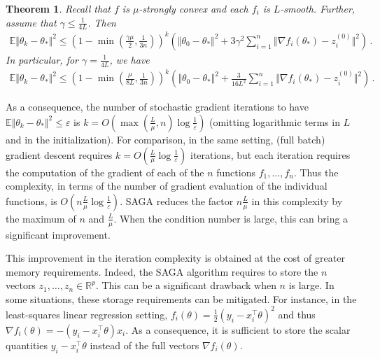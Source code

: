 \documentclass[11pt,reqno]{article}
\newcommand{\E}{\mathbb{E}}
\newcommand{\R}{\mathbb{R}}
\renewcommand{\leq}{\leqslant}
\numberwithin{equation}{section}
\theoremstyle{plain}
\newtheorem{thm}[assumption]{Theorem}
\theoremstyle{definition}
\theoremstyle{remark}
\begin{document}
\begin{thm}
	Recall that $f$ is $\mu$-strongly convex and each $f_i$ is $L$-smooth. Further, assume that $\gamma \leq \frac{1}{4L}$. Then 
	\begin{align*}
		\E \Vert \theta_k - \theta_* \Vert^2 \leq \left(1 - \min\left(\frac{\gamma \mu}{2},\frac{1}{3n}\right)\right)^k \left(\Vert \theta_0 - \theta_* \Vert^2 + 3 \gamma^2 \sum_{i=1}^{n} \Vert \nabla f_i(\theta_*)-z_i^{(0)}\Vert^2\right) \, . 
	\end{align*}
	In particular, for $\gamma = \frac{1}{4L}$, we have
	\begin{align*}
		\E \Vert \theta_k - \theta_* \Vert^2 \leq \left(1 - \min\left(\frac{\mu}{8L},\frac{1}{3n}\right)\right)^k \left(\Vert \theta_0 - \theta_* \Vert^2 + \frac{3}{16L^2} \sum_{i=1}^{n} \Vert \nabla f_i(\theta_*)-z_i^{(0)}\Vert^2\right) \, . 
	\end{align*}
\end{thm}

As a consequence, the number of stochastic gradient iterations to have $\E \Vert \theta_k - \theta_* \Vert^2 \leq \varepsilon$ is $k = O\left(\max\left(\frac{L}{\mu}, n\right)\log \frac{1}{\varepsilon}\right)$ (omitting logarithmic terms in $L$ and in the initialization). For comparison, in the same setting, (full batch) gradient descent requires $k = O\left(\frac{L}{\mu}\log \frac{1}{\varepsilon}\right)$ iterations, but each iteration requires the computation of the gradient of each of the $n$ functions $f_1, \dots, f_n$. Thus the complexity, in terms of the number of gradient evaluation of the individual functions, is $O\left(n \frac{L}{\mu}\log \frac{1}{\varepsilon}\right)$. SAGA reduces the factor $n \frac{L}{\mu}$ in this complexity by the maximum of $n$ and $\frac{L}{\mu}$. When the condition number is large, this can bring a significant improvement. 

This improvement in the iteration complexity is obtained at the cost of greater memory requirements. Indeed, the SAGA algorithm requires to store the $n$ vectors $z_1, \dots, z_n \in \R^p$. This can be a significant drawback when $n$ is large. In some situations, these storage requirements can be mitigated. For instance, in the least-squares linear regression setting, $f_i(\theta) = \frac{1}{2}\left(y_i - x_i^\top \theta\right)^2$ and thus $\nabla f_i(\theta) = - (y_i - x_i^\top \theta) x_i$. As a consequence, it is sufficient to store the scalar quantities $y_i - x_i^\top \theta$ instead of the full vectors $\nabla f_i(\theta)$.
\end{document}
